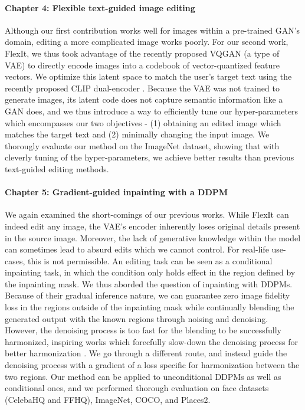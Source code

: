 \paragraph{Chapter 4: Flexible text-guided image editing}

Although our first contribution works well for images within a pre-trained \ac{GAN}'s  domain, 
editing a more complicated image works poorly. For our second work, FlexIt, we thus took advantage of the 
recently proposed  VQGAN \citep{esser2021taming} (a type of \ac{VAE}) to directly encode images into a codebook of vector-quantized
feature vectors. We optimize this latent space to match the user's target text using the recently proposed 
CLIP dual-encoder \citep{radford2021learning}. Because the \ac{VAE} was not trained to generate images,
its latent code does not capture semantic information like a \ac{GAN} does, and we thus introduce
 a way to efficiently tune our hyper-parameters 
 which encompasses our two 
objectives - (1) obtaining an edited image which matches the target text and (2) minimally changing 
the input image. We thorougly evaluate our method on the ImageNet dataset, showing that with cleverly
tuning of the hyper-parameters, we achieve better results than previous text-guided editing methods.


\paragraph{Chapter 5: Gradient-guided inpainting with a \ac{DDPM}}

We again examined the short-comings of our previous works. While FlexIt can indeed edit any image, 
the \ac{VAE}'s encoder inherently loses original details present in the source image. Moreover,
the lack of generative knowledge within the model can sometimes lead to absurd edits which 
we cannot control. For real-life 
use-cases, this is not permissible. An editing task can be seen as a conditional inpainting 
task, in which the condition only holds effect in the region defined by the inpainting mask. We thus 
aborded the question of inpainting with \ac{DDPM}s. Because of their gradual inference nature, we can 
guarantee zero image fidelity loss in the regions outside of the inpainting mask while continually 
blending the generated output with the known regions through noising and denoising. However, the 
denoising process is too fast for the blending to be successfully harmonized, inspiring works which 
forecfully slow-down the denoising process for better harmonization \citep{lugmayr2022repaint}. We 
go through a different route, and instead guide the denoising process with a gradient of a loss 
specific for harmonization between the two regions. Our method can be applied to unconditional \ac{DDPM}s 
as well as conditional ones, and we performed thorough evaluation on face datasets (CelebaHQ and FFHQ),
 ImageNet, COCO, 
and Places2. 



















